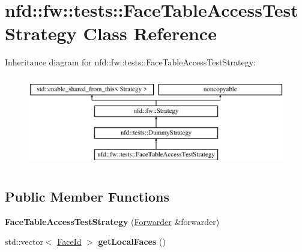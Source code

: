 \hypertarget{classnfd_1_1fw_1_1tests_1_1FaceTableAccessTestStrategy}{}\section{nfd\+:\+:fw\+:\+:tests\+:\+:Face\+Table\+Access\+Test\+Strategy Class Reference}
\label{classnfd_1_1fw_1_1tests_1_1FaceTableAccessTestStrategy}
Inheritance diagram for nfd\+:\+:fw\+:\+:tests\+:\+:Face\+Table\+Access\+Test\+Strategy\+:\begin{figure}[H]
\begin{center}
\leavevmode
\includegraphics[height=4.000000cm]{classnfd_1_1fw_1_1tests_1_1FaceTableAccessTestStrategy}
\end{center}
\end{figure}
\subsection*{Public Member Functions}
\begin{DoxyCompactItemize}
\item 
{\bfseries Face\+Table\+Access\+Test\+Strategy} (\hyperlink{classnfd_1_1Forwarder}{Forwarder} \&forwarder)\hypertarget{classnfd_1_1fw_1_1tests_1_1FaceTableAccessTestStrategy_ae3bb8c49f76ce2169b40385a4cec582d}{}\label{classnfd_1_1fw_1_1tests_1_1FaceTableAccessTestStrategy_ae3bb8c49f76ce2169b40385a4cec582d}

\item 
std\+::vector$<$ \hyperlink{classFaceId}{Face\+Id} $>$ {\bfseries get\+Local\+Faces} ()\hypertarget{classnfd_1_1fw_1_1tests_1_1FaceTableAccessTestStrategy_a34ae9d99bd8e73dc5871b446394c7a0f}{}\label{classnfd_1_1fw_1_1tests_1_1FaceTableAccessTestStrategy_a34ae9d99bd8e73dc5871b446394c7a0f}

\end{DoxyCompactItemize}
